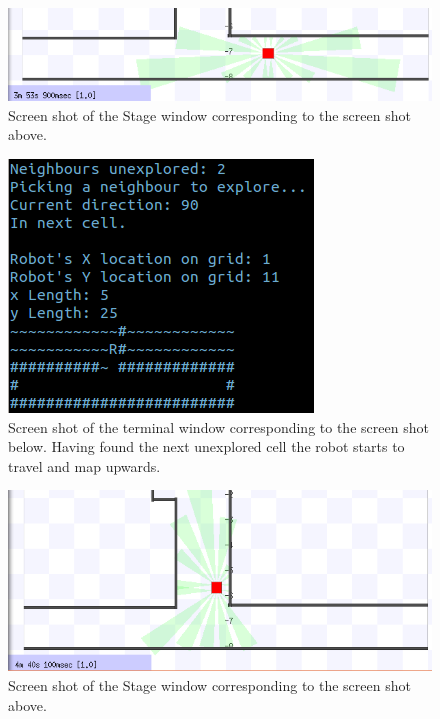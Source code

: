 \documentclass[a4paper,12pt]{article}
\begin{document}
\begin{figure}[H]
\includegraphics[scale=0.9]{RunS1.png}
\caption{Screen shot of the Stage window corresponding to the screen shot above.}
\end{figure}

\begin{figure}[H]
\includegraphics[scale=1.0]{RunT2.png}
\caption{Screen shot of the terminal window corresponding to the screen shot below. Having found the next unexplored cell the robot starts to travel and map upwards.}
\end{figure}

\begin{figure}[H]
\includegraphics[scale=0.9]{RunS2.png}
\caption{Screen shot of the Stage window corresponding to the screen shot above.}
\end{figure}
\end{document}
